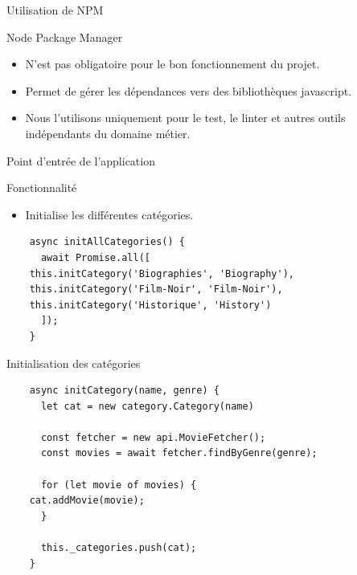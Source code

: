 \begin{frame}{Utilisation de NPM}
  \begin{block}{Node Package Manager}
    \begin{itemize}
    \item N'est pas obligatoire pour le bon fonctionnement du projet.
    \item Permet de gérer les dépendances vers des bibliothèques javascript.
    \item Nous l'utilisons uniquement pour le test, le linter et autres
      outils indépendants du domaine métier.
    \end{itemize}
  \end{block}
\end{frame}


\begin{frame}[fragile]{Point d'entrée de l'application}
  \begin{block}{Fonctionnalité}
    \begin{itemize}
    \item Initialise les différentes catégories.
    \end{itemize}
  \end{block}
  
  \begin{verbatim}
    async initAllCategories() {
      await Promise.all([	   
	this.initCategory('Biographies', 'Biography'),
	this.initCategory('Film-Noir', 'Film-Noir'),
	this.initCategory('Historique', 'History')
      ]);
    }
  \end{verbatim}  
\end{frame}

\begin{frame}[fragile]{Initialisation des catégories}
  \begin{verbatim}
    async initCategory(name, genre) {
      let cat = new category.Category(name)

      const fetcher = new api.MovieFetcher();
      const movies = await fetcher.findByGenre(genre);

      for (let movie of movies) {
	cat.addMovie(movie);
      }

      this._categories.push(cat);	
    }
  \end{verbatim}
\end{frame}

